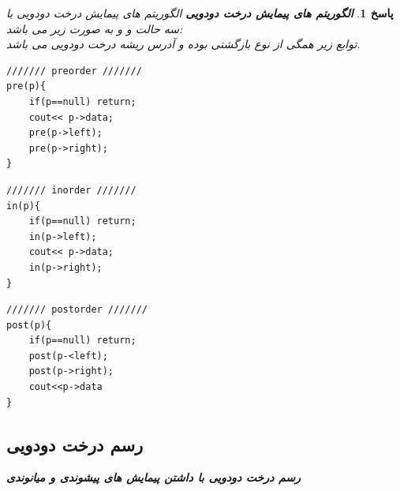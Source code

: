 \documentclass[12pt]{article}
\newtheorem{answer}{پاسخ}[section]
\begin{document}
\begin{answer}
\newpage
\textbf{الگوریتم های پیمایش درخت دودویی}
\newline
الگوریتم های پیمایش درخت دودویی با سه حالت  و 
 و  به صورت زیر می باشد:\\
توابع زیر همگی از نوع بازگشتی بوده و  آدرس ریشه درخت دودویی می باشد.\\
\begin{center}
\begin{latin}
\begin{minipage}{0.5\textwidth}
\begin{lstlisting}
/////// preorder ///////
pre(p){
	if(p==null)	return;
	cout<< p->data;
	pre(p->left);
	pre(p->right);
}
\end{lstlisting}
\end{minipage}%
\hfill
\begin{minipage}{0.5\textwidth}
\begin{lstlisting}
/////// inorder ///////
in(p){
	if(p==null)	return;
	in(p->left);
	cout<< p->data;
	in(p->right);
}
\end{lstlisting}
\end{minipage}
\end{latin}
\end{center}

\begin{latin}
\begin{lstlisting}
/////// postorder ///////
post(p){
	if(p==null) return;
	post(p-<left);
	post(p->right);
	cout<<p->data
}
\end{lstlisting}
\end{latin}
\newpage

\subsection{رسم درخت دودویی}


\textbf{رسم درخت دودویی با داشتن پیمایش های پیشوندی و میانوندی}


\end{answer}
\end{document}
